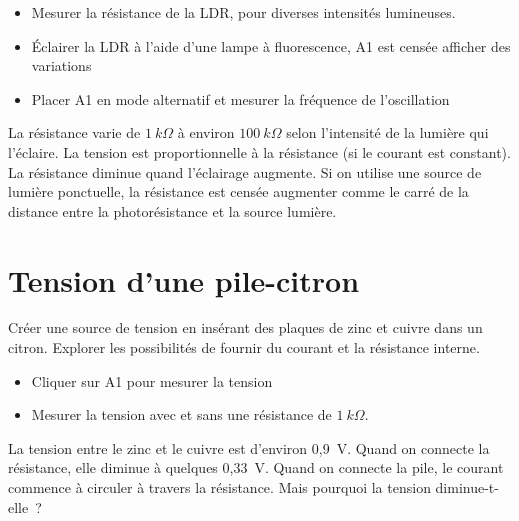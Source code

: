 \documentclass[a4paper,12pt,french]{sphinxmanual}
\let\sphinxpxdimen\pdfpxdimen\else\newdimen\sphinxpxdimen
\begin{document}
\begin{itemize}
\item {} 
Mesurer la résistance de la LDR, pour diverses intensités lumineuses.

\item {} 
Éclairer la LDR à l’aide d’une lampe à fluorescence, A1 est censée
afficher des variations

\item {} 
Placer A1 en mode alternatif et mesurer la fréquence de l’oscillation

\end{itemize}


La résistance varie de \(1~k\Omega\) à environ \(100~k\Omega\)
selon l’intensité de la lumière qui l’éclaire. La tension est
proportionnelle à la résistance (si le courant est constant). La
résistance diminue quand l’éclairage augmente. Si on utilise une
source de lumière ponctuelle, la résistance est censée augmenter comme
le carré de la distance entre la photorésistance et la source lumière.


\section{Tension d’une pile-citron}
\label{\detokenize{2.15:tension-dune-pile-citron}}\label{\detokenize{2.15::doc}}

Créer une source de tension en insérant des plaques de zinc et cuivre
dans un citron. Explorer les possibilités de fournir du courant et la
résistance interne.

\noindent\sphinxincludegraphics[width=300\sphinxpxdimen]{{lemon-cell}.pdf}

\begin{itemize}
\item {} 
Cliquer sur A1 pour mesurer la tension

\item {} 
Mesurer la tension avec et sans une résistance de \(1~k\Omega\).

\end{itemize}


La tension entre le zinc et le cuivre est d’environ 0,9 V. Quand on
connecte la résistance, elle diminue à quelques 0,33 V. Quand on
connecte la pile, le courant commence à circuler à travers la
résistance. Mais pourquoi la tension diminue-t-elle ?
\end{document}
